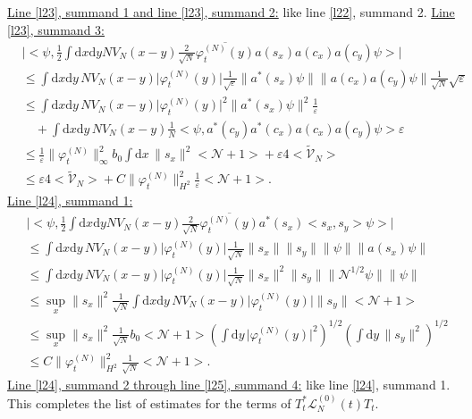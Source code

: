 \documentclass[11pt,a4paper,draft,DIV11]{scrartcl}	%
\newcommand{\di}{\textrm{d}}		%
\newcommand{\Lcal}{\mathcal{L}}		%
\newcommand{\Ncal}{\mathcal{N}}		%
\newcommand{\tilV}{\tilde{\mathcal{V}}_N}		%
\newcommand{\estlist}[2]{\underline{Line \ref{l#1}, summand #2:}}
\newcommand{\nestlist}[2]{line \ref{l#1}, summand #2}
\newcommand{\Nestlist}[2]{Line \ref{l#1}, summand #2}
\newcommand{\scal}[2]{\big<#1,#2\big>} %
\newcommand{\cc}[1]{\overline{#1}}	%
\newcommand{\norm}[1]{\lVert#1\rVert}	%
\newcommand{\ev}[1]{\big<#1\big>}	%
\newcommand{\ph}{\varphi_t^{(N)}}	%
\newcommand{\dxyNV}{\frac{1}{2}\int \di x\di y N V_N(x-y)} %
\begin{document}
\underline{\Nestlist{23}{1} and \nestlist{23}{2}:} %
like \nestlist{22}{2}.\newline
\estlist{23}{3}
\begin{align*}
& \lvert \scal{\psi}{\dxyNV \frac{2}{\sqrt{N}} \cc{\ph(y)} a(s_x) a(c_x) a(c_y)\psi} \rvert \\
& \leq \int \di x\di y\, NV_N(x-y) \lvert \ph(y)\rvert \frac{1}{\sqrt{\varepsilon}} \norm{a^\ast(s_x)\psi} \norm{a(c_x)a(c_y)\psi}\frac{1}{\sqrt{N}}\sqrt{\varepsilon} \\
& \leq \int \di x\di y\, NV_N(x-y) \lvert \ph(y)\rvert^2
  \norm{a^\ast(s_x)\psi}^2\frac{1}{\varepsilon} \\
& \quad + \int \di x\di y\, NV_N(x-y) \frac{1}{N} \scal{\psi}{a^\ast(c_y)a^\ast(c_x)a(c_x)a(c_y)\psi}\varepsilon \\
& \leq \frac{1}{\varepsilon} \norm{\ph}_\infty^2 b_0 \int \di x\, \norm{s_x}^2 \ev{\Ncal+1} + \varepsilon 4 \ev{\tilV}\\
& \leq \varepsilon 4 \ev{\tilV} + C\norm{\ph}_{H^2}^2 \frac{1}{\varepsilon}\ev{\Ncal+1}.
\end{align*}
\estlist{24}{1}
\begin{align*}
 & \lvert \scal{\psi}{\dxyNV \frac{2}{\sqrt{N}}\cc{\ph(y)}a^\ast(s_x)\scal{s_x}{s_y}\psi} \rvert \\
& \leq \int \di x\di y\, NV_N(x-y) \lvert \ph(y)\rvert \frac{1}{\sqrt{N}} \norm{s_x} \norm{s_y} \norm{\psi} \norm{a(s_x)\psi} \\
& \leq \int \di x\di y\, NV_N(x-y) \lvert \ph(y)\rvert \frac{1}{\sqrt{N}} \norm{s_x}^2 \norm{s_y} \norm{\Ncal^{1/2}\psi} \norm{\psi} \\
& \leq \sup_x \norm{s_x}^2 \frac{1}{\sqrt{N}} \int \di x\di y\, NV_N(x-y) \lvert \ph(y)\rvert \norm{s_y} \ev{\Ncal+1} \\
& \leq \sup_x \norm{s_x}^2 \frac{1}{\sqrt{N}} b_0 \ev{\Ncal+1} \left( \int \di y\, \lvert \ph(y)\rvert^2 \right)^{1/2} \left( \int \di y\, \norm{s_y}^2 \right)^{1/2} \\
& \leq C\norm{\ph}_{H^2}^2 \frac{1}{\sqrt{N}}\ev{\Ncal+1}.
\end{align*}
\underline{\Nestlist{24}{2} through \nestlist{25}{4}:} like \nestlist{24}{1}.\newline
This completes the list of estimates for the terms of $T^*_t \Lcal_N^{(0)}(t) T_t$.\vspace{1em}
\end{document}

